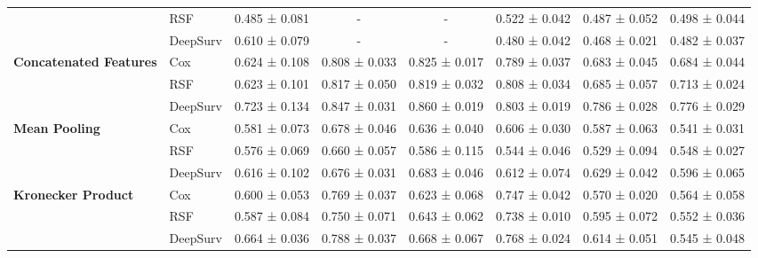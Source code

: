 \begin{sidewaystable}[htbp]
\begin{tabular}{@{}llcccccc@{}}
        & RSF & 0.485 ± 0.081 & - & - & 0.522 ± 0.042 & 0.487 ± 0.052 & 0.498 ± 0.044 \\
        & DeepSurv & 0.610 ± 0.079 & - & - & 0.480 ± 0.042 & 0.468 ± 0.021 & 0.482 ± 0.037 \\
        \midrule
        \multirow{3}{*}{\textbf{Concatenated Features}} & Cox & 0.624 ± 0.108 & 0.808 ± 0.033 & 0.825 ± 0.017 & 0.789 ± 0.037 & 0.683 ± 0.045 & 0.684 ± 0.044 \\
        & RSF & 0.623 ± 0.101 & 0.817 ± 0.050 & 0.819 ± 0.032 & 0.808 ± 0.034 & 0.685 ± 0.057 & 0.713 ± 0.024 \\
        & DeepSurv & 0.723 ± 0.134 & 0.847 ± 0.031 & 0.860 ± 0.019 & 0.803 ± 0.019 & 0.786 ± 0.028 & 0.776 ± 0.029 \\
        \midrule
        \multirow{3}{*}{\textbf{Mean Pooling}} & Cox & 0.581 ± 0.073 & 0.678 ± 0.046 & 0.636 ± 0.040 & 0.606 ± 0.030 & 0.587 ± 0.063 & 0.541 ± 0.031 \\
        & RSF & 0.576 ± 0.069 & 0.660 ± 0.057 & 0.586 ± 0.115 & 0.544 ± 0.046 & 0.529 ± 0.094 & 0.548 ± 0.027 \\
        & DeepSurv & 0.616 ± 0.102 & 0.676 ± 0.031 & 0.683 ± 0.046 & 0.612 ± 0.074 & 0.629 ± 0.042 & 0.596 ± 0.065 \\
        \midrule
        \multirow{3}{*}{\textbf{Kronecker Product}} & Cox & 0.600 ± 0.053 & 0.769 ± 0.037 & 0.623 ± 0.068 & 0.747 ± 0.042 & 0.570 ± 0.020 & 0.564 ± 0.058 \\
        & RSF & 0.587 ± 0.084 & 0.750 ± 0.071 & 0.643 ± 0.062 & 0.738 ± 0.010 & 0.595 ± 0.072 & 0.552 ± 0.036 \\
        & DeepSurv & 0.664 ± 0.036 & 0.788 ± 0.037 & 0.668 ± 0.067 & 0.768 ± 0.024 & 0.614 ± 0.051 & 0.545 ± 0.048 \\
        \bottomrule
    \end{tabular}
\end{sidewaystable}